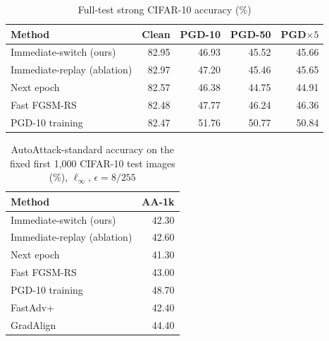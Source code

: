 \begin{table}[t]
\centering
\caption{Full-test strong CIFAR-10 accuracy (\%)}
\label{tab:test}
\scriptsize
\setlength{\tabcolsep}{2pt}
\begin{tabular}{lrrrr}
\toprule
Method & Clean & PGD-10 & PGD-50 & PGD$\times5$ \\
\midrule
Immediate-switch (ours) & 82.95 & 46.93 & 45.52 & 45.66 \\
Immediate-replay (ablation) & 82.97 & 47.20 & 45.46 & 45.65 \\
Next epoch & 82.57 & 46.38 & 44.75 & 44.91 \\
Fast FGSM-RS & 82.48 & 47.77 & 46.24 & 46.36 \\
PGD-10 training & 82.47 & 51.76 & 50.77 & 50.84 \\
\bottomrule
\end{tabular}
\end{table}

\begin{table}[t]
\centering
\caption{AutoAttack-standard accuracy on the fixed first 1,000 CIFAR-10 test
images (\%), $\ell_\infty$, $\epsilon=8/255$}
\label{tab:aa}
\scriptsize
\setlength{\tabcolsep}{6pt}
\begin{tabular}{lr}
\toprule
Method & AA-1k \\
\midrule
Immediate-switch (ours) & 42.30 \\
Immediate-replay (ablation) & 42.60 \\
Next epoch & 41.30 \\
Fast FGSM-RS & 43.00 \\
PGD-10 training & 48.70 \\
FastAdv+ & 42.40 \\
GradAlign & 44.40 \\
\bottomrule
\end{tabular}
\end{table}

